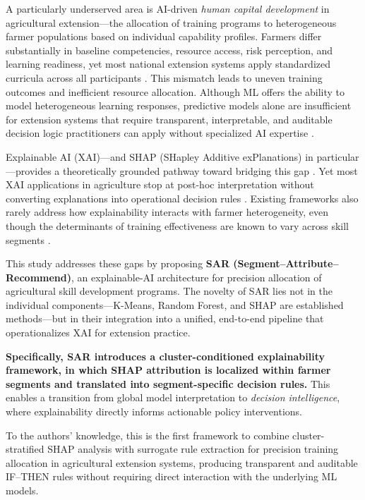 \documentclass[3p,twocolumn,authoryear]{elsarticle}
\begin{document}
A particularly underserved area is AI-driven \textit{human capital
development} in agricultural extension---the allocation of training
programs to heterogeneous farmer populations based on individual
capability profiles.
Farmers differ substantially in baseline competencies, resource access,
risk perception, and learning readiness, yet most national extension
systems apply standardized curricula across all participants
\citep{anderson2004,feder1985}.
This mismatch leads to uneven training outcomes and inefficient resource
allocation.
Although ML offers the ability to model heterogeneous learning responses,
predictive models alone are insufficient for extension systems that
require transparent, interpretable, and auditable decision logic
practitioners can apply without specialized AI expertise
\citep{arrieta2020,lundberg2020}.

Explainable AI (XAI)---and SHAP (SHapley Additive exPlanations) in
particular---provides a theoretically grounded pathway toward bridging
this gap \citep{lundberg2017,guidotti2019}.
Yet most XAI applications in agriculture stop at post-hoc interpretation
without converting explanations into operational decision rules
\citep{ryo2022,linardatos2021}.
Existing frameworks also rarely address how explainability interacts with
farmer heterogeneity, even though the determinants of training
effectiveness are known to vary across skill segments
\citep{davis2012,arrieta2020}.

This study addresses these gaps by proposing \textbf{SAR
(Segment--Attribute--Recommend)}, an explainable-AI architecture for
precision allocation of agricultural skill development programs.
The novelty of SAR lies not in the individual components---K-Means,
Random Forest, and SHAP are established methods---but in their integration
into a unified, end-to-end pipeline that operationalizes XAI for extension
practice.

\textbf{Specifically, SAR introduces a cluster-conditioned explainability
framework, in which SHAP attribution is localized within farmer segments
and translated into segment-specific decision rules.}
This enables a transition from global model interpretation to
\textit{decision intelligence}, where explainability directly informs
actionable policy interventions.

To the authors' knowledge, this is the first framework to combine
cluster-stratified SHAP analysis with surrogate rule extraction for
precision training allocation in agricultural extension systems,
producing transparent and auditable IF--THEN rules without requiring
direct interaction with the underlying ML models.
\end{document}
